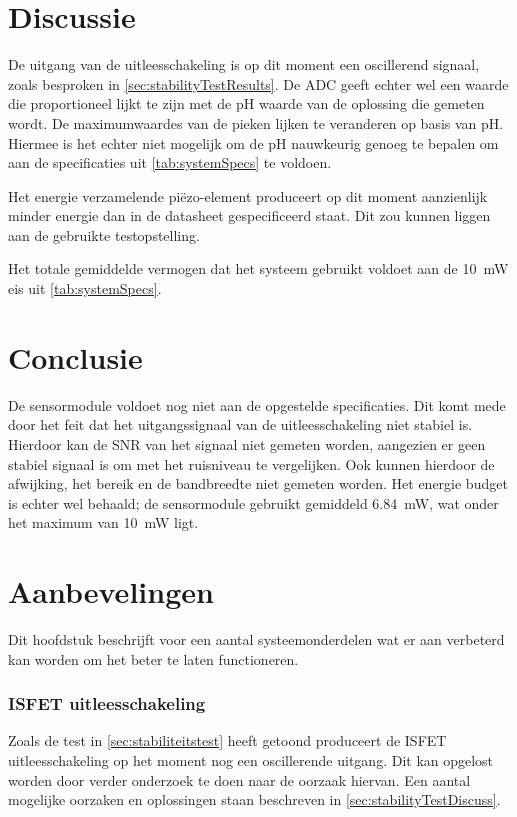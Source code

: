 \section{Discussie}


De uitgang van de uitleesschakeling is op dit moment een oscillerend signaal, zoals besproken in \cref{sec:stabilityTestResults}. De ADC geeft echter wel een waarde die proportioneel lijkt te zijn met de pH waarde van de oplossing die gemeten wordt.
De maximumwaardes van de pieken lijken te veranderen op basis van pH. Hiermee is het echter niet mogelijk om de pH nauwkeurig genoeg te bepalen om aan de specificaties uit \cref{tab:systemSpecs} te voldoen.

Het energie verzamelende piëzo-element produceert op dit moment aanzienlijk minder energie dan in de datasheet gespecificeerd staat. Dit zou kunnen liggen aan de gebruikte testopstelling.

Het totale gemiddelde vermogen dat het systeem gebruikt voldoet aan de \qty{10}{\milli\watt} eis uit \cref{tab:systemSpecs}.

\newpage
\section{Conclusie}
De sensormodule voldoet nog niet aan de opgestelde specificaties. Dit komt mede door het feit dat het uitgangssignaal van de uitleesschakeling niet stabiel is. Hierdoor kan de SNR van het signaal niet gemeten worden, aangezien er geen stabiel signaal is om met het ruisniveau te vergelijken. Ook kunnen hierdoor de afwijking, het bereik en de bandbreedte niet gemeten worden.
Het energie budget is echter wel behaald; de sensormodule gebruikt gemiddeld \qty{6.84}{\milli\watt}, wat onder het maximum van \qty{10}{\milli\watt} ligt.




\newpage
\section{Aanbevelingen}
Dit hoofdstuk beschrijft voor een aantal systeemonderdelen wat er aan verbeterd kan worden om het beter te laten functioneren.

\subsubsection*{ISFET uitleesschakeling}
Zoals de test in \cref{sec:stabiliteitstest} heeft getoond produceert de ISFET uitleesschakeling op het moment nog een oscillerende uitgang. Dit kan opgelost worden door verder onderzoek te doen naar de oorzaak hiervan. Een aantal mogelijke oorzaken en oplossingen staan beschreven in \cref{sec:stabilityTestDiscuss}.

